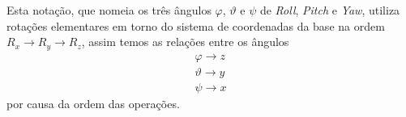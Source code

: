 
Esta notação, que nomeia os três ângulos $\varphi$, $\vartheta$ e $\psi$ de \emph{Roll}, \emph{Pitch} e \emph{Yaw}, utiliza rotações elementares em torno do sistema de coordenadas da base na ordem $R_x \to R_y \to R_z$, assim temos as relações entre os ângulos
\begin{align*}
    \varphi \to z \\
    \vartheta \to y \\
    \psi \to  x
\end{align*}
por causa da ordem das operações.

